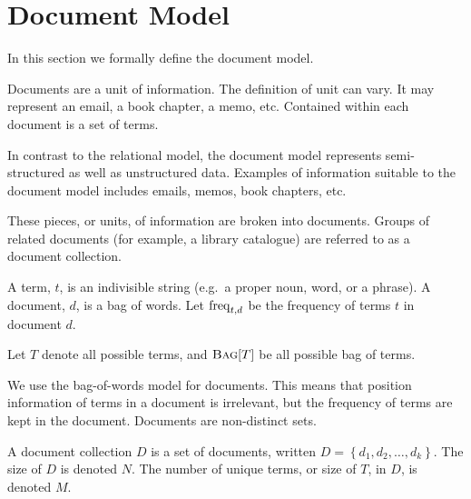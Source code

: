 \section{Document Model}
	In this section we formally define the document model.
	
	Documents are a unit of information.  The definition of unit can vary.  It may represent an email, a book chapter, a memo, etc.  Contained within each document is a set of terms.
	
	In contrast to the relational model, the document model represents semi-structured as well as unstructured data.  Examples of information suitable to the document model includes emails, memos, book chapters, etc.
	
	These pieces, or units, of information are broken into documents.  Groups of related documents (for example, a library catalogue) are referred to as a document collection.

	\begin{defn}
	\label{def:document}
		A term, $t$, is an indivisible string (e.g.~a proper noun, word, or a phrase).  A document, $d$, is a bag of words.  Let $\operatorname{freq}_{t, d}$ be the frequency of terms $t$ in document $d$.
		
		Let $T$ denote all possible terms, and $\textsc{Bag}\lbrack T\rbrack$ be all possible bag of terms.
	\end{defn}
	
	\begin{remark}
		We use the bag-of-words model for documents.  This means that position information of terms in a document is irrelevant, but the frequency of terms are kept in the document.  Documents are non-distinct sets.
	\end{remark}
	
	\begin{defn}
	\label{def:document-collection}
		A document collection $D$ is a set of documents, written $D = \left\{d_1, d_2, \dotsc, d_k\right\}$.  The size of $D$ is denoted $N$.  The number of unique terms, or size of $T$, in $D$, is denoted $M$.
	\end{defn}
	
